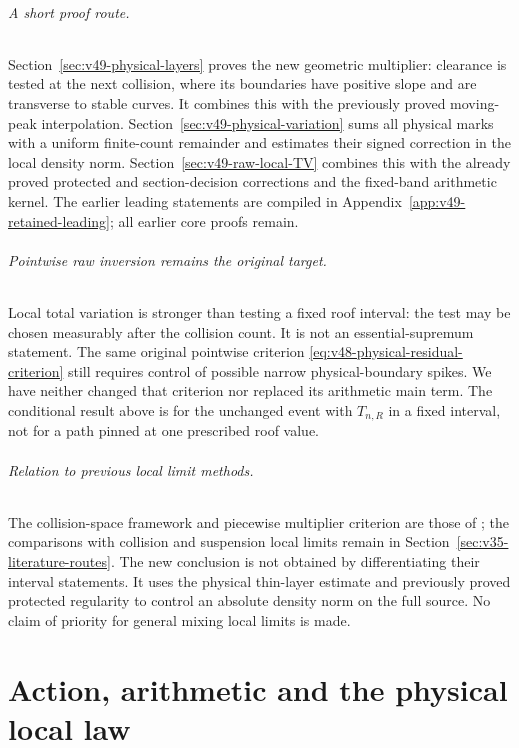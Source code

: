 \documentclass[11pt,reqno]{amsart}
\numberwithin{equation}{section}
\theoremstyle{definition}\newtheorem{definition}[theorem]{Definition}
\theoremstyle{remark}\newtheorem{remark}[theorem]{Remark}
\begin{document}
\paragraph{A short proof route.}
Section~\ref{sec:v49-physical-layers} proves the new geometric
multiplier: clearance is tested at the next collision, where its
boundaries have positive slope and are transverse to stable curves.
It combines this with the previously proved moving-peak interpolation.
Section~\ref{sec:v49-physical-variation} sums all physical marks
with a uniform finite-count remainder and estimates their signed
correction in the local density norm.
Section~\ref{sec:v49-raw-local-TV} combines this with the already
proved protected and section-decision corrections and the fixed-band
arithmetic kernel. The earlier leading statements are compiled in
Appendix~\ref{app:v49-retained-leading}; all earlier core proofs remain.

\paragraph{Pointwise raw inversion remains the original target.}
Local total variation is stronger than testing a fixed roof interval:
the test may be chosen measurably after the collision count. It is not
an essential-supremum statement. The same original pointwise criterion
\eqref{eq:v48-physical-residual-criterion} still requires control of
possible narrow physical-boundary spikes. We have neither changed that
criterion nor replaced its arithmetic main term. The conditional result
above is for the unchanged event with $T_{n,R}$ in a fixed interval,
not for a path pinned at one prescribed roof value.

\paragraph{Relation to previous local limit methods.}
The collision-space framework and piecewise multiplier criterion are
those of \cite{DZ11,DZ,DPZ}; the comparisons with collision and
suspension local limits remain in
Section~\ref{sec:v35-literature-routes}. The new conclusion is not
obtained by differentiating their interval statements. It uses the
physical thin-layer estimate and previously proved protected
regularity to control an absolute density norm on the full source.
No claim of priority for general mixing local limits is made.

\part{Action, arithmetic and the physical local law}









\end{document}
